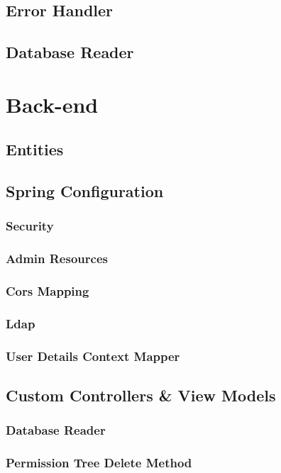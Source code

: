 \subsection{Error Handler}
\subsection{Database Reader}

\section{Back-end}
\label{cha:implementation:sec:back-end}

\subsection{Entities}
\subsection{Spring Configuration}
\subsubsection{Security}
\subsubsection{Admin Resources}
\subsubsection{Cors Mapping}
\subsubsection{Ldap}
\subsubsection{User Details Context Mapper}
\subsection{Custom Controllers \& View Models}
\subsubsection{Database Reader}
\subsubsection{Permission Tree Delete Method}

